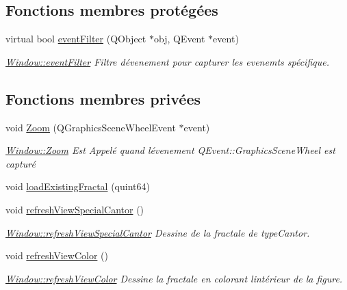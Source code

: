 \subsection*{Fonctions membres protégées}
\begin{DoxyCompactItemize}
\item 
virtual bool \hyperlink{class_window_a7c7748b81d769f66a2131c2f66541da9}{event\+Filter} (Q\+Object $\ast$obj, Q\+Event $\ast$event)
\begin{DoxyCompactList}\small\item\em \hyperlink{class_window_a7c7748b81d769f66a2131c2f66541da9}{Window\+::event\+Filter} Filtre d\textquotesingle{}évenement pour capturer les evenemts spécifique. \end{DoxyCompactList}\end{DoxyCompactItemize}
\subsection*{Fonctions membres privées}
\begin{DoxyCompactItemize}
\item 
void \hyperlink{class_window_ae089aa7bf8d19a66e1813f25d64435ca}{Zoom} (Q\+Graphics\+Scene\+Wheel\+Event $\ast$event)
\begin{DoxyCompactList}\small\item\em \hyperlink{class_window_ae089aa7bf8d19a66e1813f25d64435ca}{Window\+::\+Zoom} Est Appelé quand l\textquotesingle{}évenement Q\+Event\+::\+Graphics\+Scene\+Wheel est capturé \end{DoxyCompactList}\item 
void \hyperlink{class_window_a6b9597000158ae977ff7f701b66ce2e0}{load\+Existing\+Fractal} (quint64)
\item 
void \hyperlink{class_window_a2a3bd6eafe51a29fdb25513466091e7a}{refresh\+View\+Special\+Cantor} ()
\begin{DoxyCompactList}\small\item\em \hyperlink{class_window_a2a3bd6eafe51a29fdb25513466091e7a}{Window\+::refresh\+View\+Special\+Cantor} Dessine de la fractale de type\+Cantor. \end{DoxyCompactList}\item 
void \hyperlink{class_window_a857cb462b4515ded7a0bcb54879f10cf}{refresh\+View\+Color} ()
\begin{DoxyCompactList}\small\item\em \hyperlink{class_window_a857cb462b4515ded7a0bcb54879f10cf}{Window\+::refresh\+View\+Color} Dessine la fractale en colorant l\textquotesingle{}intérieur de la figure. \end{DoxyCompactList}\end{DoxyCompactItemize}
